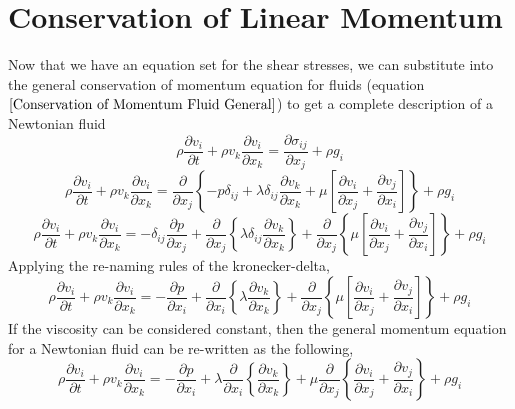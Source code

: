 \section{Conservation of Linear Momentum}
\begin{comment}
\end{comment}
Now that we have an equation set for the shear stresses, we can substitute into the general conservation of momentum equation for fluids (equation $\ref{Conservation of Momentum Fluid General}$) to get a complete description of a Newtonian fluid
$$\rho\frac{\partial v_{i}}{\partial t} + \rho v_{k}\frac{\partial v_{i}}{\partial x_{k}} = \frac{\partial \sigma_{ij}}{\partial x_{j}}  +  \rho g_{i}$$ 
$$\rho\frac{\partial v_{i}}{\partial t} + \rho v_{k}\frac{\partial v_{i}}{\partial x_{k}} = \frac{\partial}{\partial x_{j}}\left\{-p\delta_{ij} + \lambda \delta_{ij}\frac{\partial v_{k}}{\partial x_{k}} + \mu\left[\frac{\partial v_{i}}{\partial x_{j}} + \frac{\partial v_{j}}{\partial x_{i}}\right]\right\}  +  \rho g_{i}$$ 
$$\rho\frac{\partial v_{i}}{\partial t} + \rho v_{k}\frac{\partial v_{i}}{\partial x_{k}} = -\delta_{ij}\frac{\partial p}{\partial x_{j}} + \frac{\partial}{\partial x_{j}}\left\{\lambda \delta_{ij}\frac{\partial v_{k}}{\partial x_{k}}\right\} + \frac{\partial}{\partial x_{j}}\left\{\mu\left[\frac{\partial v_{i}}{\partial x_{j}} + \frac{\partial v_{j}}{\partial x_{i}}\right]\right\}  +  \rho g_{i}$$ 
Applying the re-naming rules of the kronecker-delta,
\begin{equation}
\rho\frac{\partial v_{i}}{\partial t} + \rho v_{k}\frac{\partial v_{i}}{\partial x_{k}} = -\frac{\partial p}{\partial x_{i}} + \frac{\partial}{\partial x_{i}}\left\{\lambda\frac{\partial v_{k}}{\partial x_{k}}\right\} + \frac{\partial}{\partial x_{j}}\left\{\mu\left[\frac{\partial v_{i}}{\partial x_{j}} + \frac{\partial v_{j}}{\partial x_{i}}\right]\right\}  +  \rho g_{i} 
\label{Navier-Stokes Momentum Equation General}
\end{equation} 
If the viscosity can be considered constant, then the general momentum equation for a Newtonian fluid can be re-written as the following,
\begin{equation}
\rho\frac{\partial v_{i}}{\partial t} + \rho v_{k}\frac{\partial v_{i}}{\partial x_{k}} = -\frac{\partial p}{\partial x_{i}} + \lambda\frac{\partial}{\partial x_{i}}\left\{\frac{\partial v_{k}}{\partial x_{k}}\right\} + \mu\frac{\partial}{\partial x_{j}}\left\{ \frac{\partial v_{i}}{\partial x_{j}} + \frac{\partial v_{j}}{\partial x_{i}} \right\}  +  \rho g_{i}
\label{Navier-Stokes Momentum Constant Viscosity}
\end{equation} 
